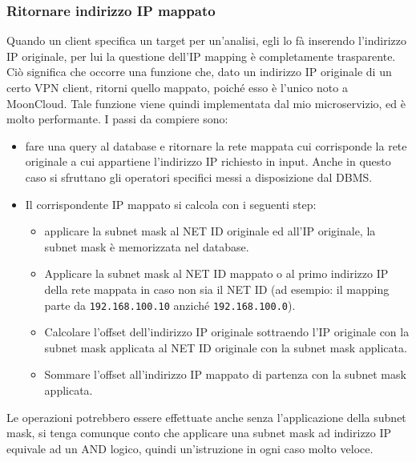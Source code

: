 \subsubsection{Ritornare indirizzo IP mappato}
Quando un client specifica un target per un'analisi, egli lo fà inserendo l'indirizzo
IP originale, per lui la questione dell'IP mapping è completamente trasparente. Ciò
significa che occorre una funzione che, dato un indirizzo IP originale di un
certo VPN client, ritorni quello mappato, poiché esso è l'unico noto a MoonCloud.
Tale funzione viene quindi implementata dal mio microservizio, ed è molto performante.
I passi da compiere sono:
\begin{itemize}
	\item fare una query al database e ritornare la rete mappata cui corrisponde
	      la rete originale a cui appartiene l'indirizzo IP richiesto in input.
	      Anche in questo caso si sfruttano gli operatori specifici messi a disposizione
	      dal DBMS.
	\item Il corrispondente IP mappato si calcola con i seguenti step:
	      \begin{itemize}
	      	\item applicare la subnet mask al NET ID originale ed all'IP originale,
	      	      la subnet mask è memorizzata nel database.
	      	\item Applicare la subnet mask al NET ID mappato o al primo indirizzo IP
	      	      della rete mappata in caso non sia il NET ID (ad esempio: il mapping
	      	      parte da \texttt{192.168.100.10} anziché \texttt{192.168.100.0}).
	      	\item Calcolare l'offset dell'indirizzo IP originale sottraendo
	      	      l'IP originale con la subnet mask applicata al NET ID originale
	      	      con la subnet mask applicata.
	      	\item Sommare l'offset all'indirizzo IP mappato di partenza con
	      	      la subnet mask applicata.
	      \end{itemize}
\end{itemize}
Le operazioni potrebbero essere effettuate anche senza l'applicazione della
subnet mask, si tenga comunque conto che applicare una subnet mask
ad indirizzo IP equivale ad un AND logico, quindi un'istruzione in ogni
caso molto veloce.


